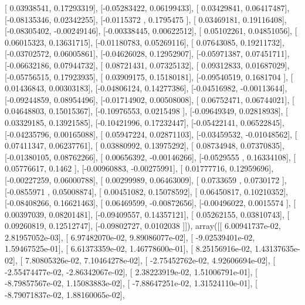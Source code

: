 \documentclass{article}
\begin{document}
       [ 0.03938541,  0.17293319],
       [-0.05283422,  0.06199433],
       [ 0.03429841,  0.06417487],
       [-0.08135346,  0.02342255],
       [-0.0115372 ,  0.1795475 ],
       [ 0.03469181,  0.19116408],
       [-0.08305402, -0.00249146],
       [-0.00338445,  0.00622512],
       [ 0.05102261,  0.04851056],
       [ 0.06015323,  0.13631715],
       [-0.01180783,  0.05269116],
       [ 0.07643085,  0.19211732],
       [-0.03702572,  0.06005861],
       [-0.04626028,  0.12952907],
       [-0.05971387,  0.07451711],
       [-0.06632186,  0.07944732],
       [ 0.08721431,  0.07325132],
       [ 0.09312833,  0.01687029],
       [-0.05756515,  0.17923935],
       [ 0.03909175,  0.15180181],
       [-0.09540519,  0.1681704 ],
       [ 0.01436843,  0.00303183],
       [-0.04806124,  0.14277386],
       [-0.04516982, -0.00113644],
       [-0.09244859,  0.08954496],
       [-0.01714902,  0.00508008],
       [ 0.06752471,  0.06744021],
       [ 0.04648803,  0.15015367],
       [-0.10976553,  0.0215498 ],
       [-0.09649349,  0.02818938],
       [ 0.03329185,  0.13921585],
       [-0.10421996,  0.17232447],
       [-0.05422141,  0.06522845],
       [-0.04235796,  0.00165088],
       [ 0.05947224,  0.02871103],
       [-0.03459532, -0.01048562],
       [ 0.07411347,  0.06237761],
       [ 0.03880992,  0.13975292],
       [ 0.08734948,  0.07370835],
       [-0.01380105,  0.08762266],
       [ 0.00656392, -0.00146266],
       [-0.0529555 ,  0.16334108],
       [ 0.05776617,  0.1462    ],
       [-0.00960883, -0.00275991],
       [ 0.01777716,  0.12959696],
       [-0.00227259,  0.06000788],
       [ 0.00299989,  0.06463009],
       [ 0.0733659 ,  0.0730172 ],
       [-0.0855971 ,  0.05008874],
       [ 0.00451082,  0.15078592],
       [ 0.06450817,  0.10210352],
       [-0.08408266,  0.16621463],
       [ 0.06469599, -0.00872656],
       [-0.00496022,  0.0015574 ],
       [ 0.00397039,  0.08201481],
       [-0.09409557,  0.14357121],
       [ 0.05262155,  0.03810743],
       [ 0.09260819,  0.12512747],
       [-0.09802727,  0.0102038 ]]), array([[  6.00941737e-02,   2.81957052e-03],
       [  6.97482070e-02,   9.89086077e-02],
       [ -9.02539401e-02,   1.59467525e-01],
       [  6.61373359e-02,   1.46778600e-01],
       [  8.25156916e-02,   1.43137635e-02],
       [  7.80805326e-02,   7.10464278e-02],
       [ -2.75452762e-02,   4.92606694e-02],
       [ -2.55474477e-02,  -2.86342067e-02],
       [  2.38223919e-02,   1.51006791e-01],
       [ -8.79857567e-02,   1.15083883e-02],
       [ -7.88647251e-02,   1.31524110e-01],
       [ -8.79071837e-02,   1.88160065e-02],
\end{document}
